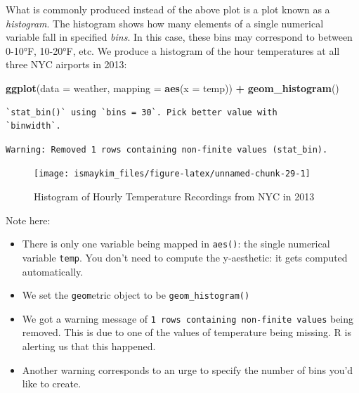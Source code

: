 \documentclass[12pt,]{krantz}
\makeatletter
\newenvironment{Shaded}{\begin{snugshade}}{\end{snugshade}}
\newcommand{\KeywordTok}[1]{\textcolor[rgb]{0.27,0.27,0.27}{\textbf{#1}}}
\newcommand{\DataTypeTok}[1]{\textcolor[rgb]{0.27,0.27,0.27}{#1}}
\newcommand{\StringTok}[1]{\textcolor[rgb]{0.5,0.5,0.5}{#1}}
\newcommand{\OperatorTok}[1]{\textcolor[rgb]{0.43,0.43,0.43}{\textbf{#1}}}
\newcommand{\NormalTok}[1]{#1}
\providecommand{\tightlist}{%
  \setlength{\itemsep}{0pt}\setlength{\parskip}{0pt}}
\newenvironment{kframe}{%
\medskip{}
\setlength{\fboxsep}{.8em}
 \def\at@end@of@kframe{}%
 \ifinner\ifhmode%
  \def\at@end@of@kframe{\end{minipage}}%
  \begin{minipage}{\columnwidth}%
 \fi\fi%
 \def\FrameCommand##1{\hskip\@totalleftmargin \hskip-\fboxsep
 \colorbox{shadecolor}{##1}\hskip-\fboxsep
     \hskip-\linewidth \hskip-\@totalleftmargin \hskip\columnwidth}%
 \MakeFramed {\advance\hsize-\width
   \@totalleftmargin\z@ \linewidth\hsize
   \@setminipage}}%
 {\par\unskip\endMakeFramed%
 \at@end@of@kframe}
\renewenvironment{Shaded}{\begin{kframe}}{\end{kframe}}
\theoremstyle{definition}
\theoremstyle{definition}
\theoremstyle{definition}
\theoremstyle{remark}
\makeatother
\begin{document}
What is commonly produced instead of the above plot is a plot known as a
\emph{histogram}. The histogram shows how many elements of a single
numerical variable fall in specified \emph{bins}. In this case, these
bins may correspond to between 0-10°F, 10-20°F, etc. We produce a
histogram of the hour temperatures at all three NYC airports in 2013:

\begin{Shaded}
\begin{Highlighting}[]
\KeywordTok{ggplot}\NormalTok{(}\DataTypeTok{data =}\NormalTok{ weather, }\DataTypeTok{mapping =} \KeywordTok{aes}\NormalTok{(}\DataTypeTok{x =}\NormalTok{ temp)) }\OperatorTok{+}
\StringTok{  }\KeywordTok{geom_histogram}\NormalTok{()}
\end{Highlighting}
\end{Shaded}

\begin{verbatim}
`stat_bin()` using `bins = 30`. Pick better value with
`binwidth`.
\end{verbatim}

\begin{verbatim}
Warning: Removed 1 rows containing non-finite values (stat_bin).
\end{verbatim}

\begin{figure}

{\centering \texttt{[image: ismaykim\_files/figure-latex/unnamed-chunk-29-1]} 

}

\caption{Histogram of Hourly Temperature Recordings from NYC in 2013}\label{fig:unnamed-chunk-29}
\end{figure}

Note here:

\begin{itemize}
\tightlist
\item
  There is only one variable being mapped in \texttt{aes()}: the single
  numerical variable \texttt{temp}. You don't need to compute the
  y-aesthetic: it gets computed automatically.
\item
  We set the \texttt{geom}etric object to be \texttt{geom\_histogram()}
\item
  We got a warning message of
  \texttt{1\ rows\ containing\ non-finite\ values} being removed. This
  is due to one of the values of temperature being missing. R is
  alerting us that this happened.\\
\item
  Another warning corresponds to an urge to specify the number of bins
  you'd like to create.
\end{itemize}
\end{document}
